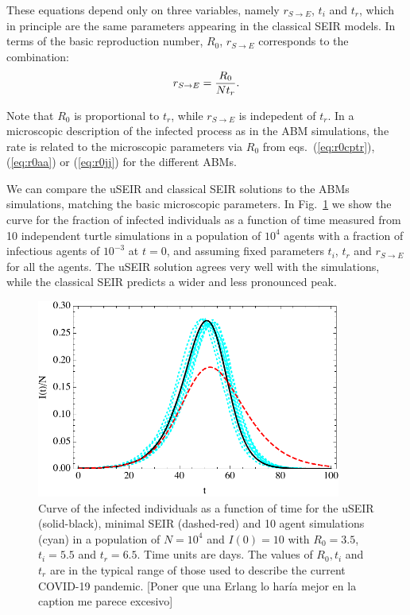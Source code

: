 \documentclass[a4paper,oneside,11pt]{article}
\newcommand{\mycomment}[1]{\textcolor[rgb]{0.75,0,0}{[#1]}}
\begin{document}
These equations depend only on three variables, namely $r_{S\rightarrow E}$, $t_i$ and $t_r$, which in principle are the same parameters appearing in the classical SEIR models. In terms of the 
basic reproduction number, $R_0$, $r_{S\rightarrow E}$ corresponds to the combination:
\begin{eqnarray}
r_{S\rightarrow E} = {R_0\over N t_r}.
\end{eqnarray}

Note that $R_0$ is proportional to $t_r$, while $r_{S\rightarrow E}$ is indepedent of $t_r$. In a microscopic description of the infected process as in the ABM simulations, the rate is related to the microscopic parameters via $R_0$ from eqs.~(\ref{eq:r0cptr}), (\ref{eq:r0aa}) or (\ref{eq:r0jj}) for the different ABMs.

  We can compare the uSEIR and classical SEIR solutions to the ABMs simulations, matching the basic microscopic parameters. 
In Fig.~\ref{fig:fixed} we show the curve for the fraction of infected individuals as a function of time measured from 10 independent turtle simulations in a population of $10^4$ agents with a fraction of infectious agents of $10^{-3}$ at $t=0$, and assuming fixed parameters $t_i$, $t_r$ and $r_{S\rightarrow E}$ for all the agents. The uSEIR solution agrees very well with the simulations, while the classical SEIR predicts a wider and less pronounced peak.

\begin{figure}[h!]
  \centering
  \includegraphics[width=10cm]{fixedraw.pdf}
  \caption{ Curve of the infected individuals as a function of time for the uSEIR (solid-black), minimal SEIR (dashed-red) and 10 agent simulations (cyan) in a  population of $N=10^4$ and $I(0)=10$ with $R_0=3.5$, $t_i=5.5$ and $t_r=6.5$. Time units are days. The values of $R_0, t_i$ and $t_r$ are in the typical range of those used to describe the
  current COVID-19 pandemic. \mycomment{Poner que una Erlang lo haría mejor en la caption me parece excesivo}}
  \label{fig:fixed}
   \end{figure}
\end{document}
